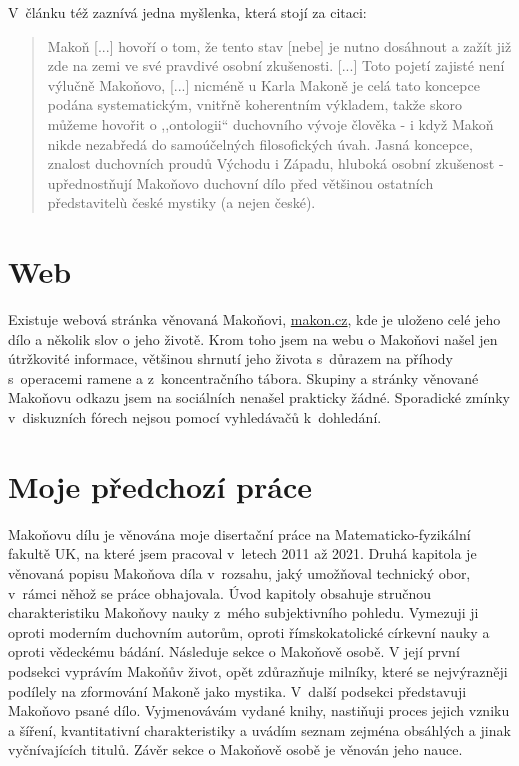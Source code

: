 V~článku též zaznívá jedna myšlenka, která stojí za citaci:
\begin{quote}
Makoň [...] hovoří o tom, že tento stav [nebe] je
nutno dosáhnout a zažít již zde na zemi ve
své pravdivé osobní zkušenosti. [...]
Toto pojetí zajisté není výlučně Makoňovo, [...]
nicméně u Karla Makoně je celá tato koncepce podána systematickým, vnitřně
koherentním výkladem, takže skoro můžeme hovořit o ,,ontologii`` duchovního
vývoje člověka - i když Makoň nikde nezabředá do samoúčelných filosofických
úvah. Jasná koncepce, znalost duchovních proudů Východu i Západu, hluboká osobní
zkušenost - upřednostňují Makoňovo duchovní dílo před většinou ostatních
představitelù české mystiky (a nejen české).
\end{quote}

\section{Web}

Existuje webová stránka věnovaná Makoňovi, \url{makon.cz}, kde je uloženo celé
jeho dílo a několik slov o jeho životě. Krom toho jsem na webu o Makoňovi našel
jen útržkovité informace, většinou shrnutí jeho života s~důrazem na příhody
s~operacemi ramene a z~koncentračního tábora.
Skupiny a stránky věnované Makoňovu odkazu jsem na sociálních nenašel prakticky
žádné. Sporadické zmínky v~diskuzních fórech nejsou pomocí vyhledávačů
k~dohledání.

\section{Moje předchozí práce}

Makoňovu dílu je věnována moje disertační práce na Matematicko-fyzikální fakultě
UK, na které jsem pracoval v~letech 2011 až 2021. Druhá kapitola je věnovaná
popisu Makoňova díla v~rozsahu, jaký umožňoval technický obor, v~rámci něhož se
práce obhajovala. Úvod kapitoly obsahuje stručnou charakteristiku Makoňovy nauky
z~mého subjektivního pohledu. Vymezuji ji oproti moderním duchovním autorům,
oproti římskokatolické církevní nauky a oproti vědeckému bádání. Následuje sekce
o Makoňově osobě. V její první podsekci vyprávím Makoňův život, opět zdůrazňuje
milníky, které se nejvýrazněji podílely na zformování Makoně jako mystika.
V~další podsekci představuji Makoňovo psané dílo.  Vyjmenovávám vydané knihy,
nastiňuji proces jejich vzniku a šíření, kvantitativní charakteristiky a uvádím
seznam zejména obsáhlých a jinak vyčnívajících titulů. Závěr sekce o Makoňově
osobě je věnován jeho nauce.

